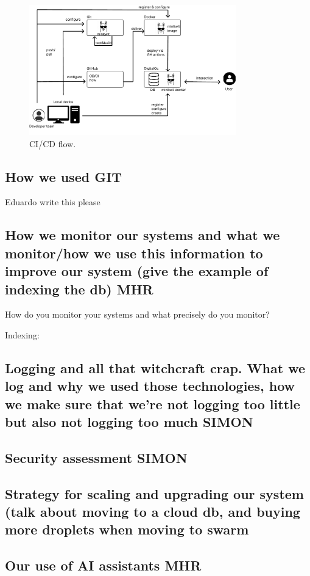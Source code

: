 \documentclass{article}
\begin{document}
\begin{figure}[ht]
    \centering
    \includegraphics[width=0.8\textwidth]{./pdfs/CD-CI-flow.pdf} 
    \caption{CI/CD flow.}
    \label{fig:CD/CI flow}
\end{figure}

\subsection{How we used GIT}
Eduardo write this please
\subsection{How we monitor our systems and what we monitor/how we use this information to improve our system (give the example of indexing the db) MHR}

How do you monitor your systems and what precisely do you monitor?

Indexing:

\subsection{Logging and all that witchcraft crap. What we log and why we used those technologies, how we make sure that we're not logging too little but also not logging too much SIMON}
\subsection{Security assessment SIMON}
\subsection{Strategy for scaling and upgrading our system (talk about moving to a cloud db, and buying more droplets when moving to swarm}
\subsection{Our use of AI assistants MHR}
\end{document}
